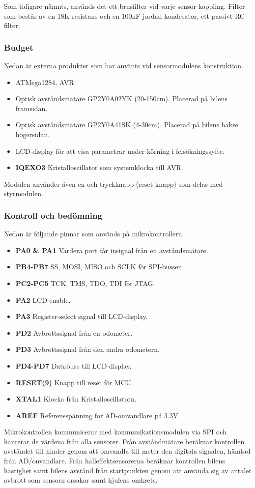 \documentclass[tekniskrapport/tech.tex]{subfiles}
\begin{document}
Som tidigare nämnts, används det ett brusfilter vid varje sensor koppling. Filter som består av en 18K resistans och en 100nF jordad kondesator, ett passivt RC-filter.

\subsubsection{Budget}
Nedan är externa produkter som har använts vid sensormodulens konstruktion.
\begin{itemize}
	\item \textbf{\modMicrocontroller} ATMega1284, AVR. 
    \item \textbf{\modDistf} Optisk avståndsmätare GP2Y0A02YK (20-150cm). Placerad på bilens framsidan.
    \item \textbf{\modDists} Optisk avståndsmätare GP2Y0A41SK (4-30cm). Placerad på bilens bakre högersidan.
    \item \textbf{\modLcd} LCD-display för att visa parametrar under körning
    i felsökningssyfte.
    \item \textbf{IQEXO3} Kristalloscillator som systemklocka till AVR.
\end{itemize}
Modulen använder även en {\modJtag} och tryckknapp (reset knapp) som delas med styrmodulen.

\subsubsection{Kontroll och bedömning}
Nedan är följande pinnar som används på mikrokontrollern.
\begin{itemize}
   \item \textbf{PA0 \& PA1} Vardera port får insignal från en avståndsmätare.
   \item \textbf{PB4-PB7} SS, MOSI, MISO och SCLK för SPI-bussen.
   \item \textbf{PC2-PC5} TCK, TMS, TDO, TDI för JTAG.
   \item \textbf{PA2} LCD-enable.
   \item \textbf{PA3} Register-select signal till LCD-display.
   \item \textbf{PD2} Avbrottssignal från en odometer.
   \item \textbf{PD3} Avbrottssignal från den andra odometern.
   \item \textbf{PD4-PD7} Databuss till LCD-display.
   \item \textbf{RESET(9)} Knapp till reset för MCU.
   \item \textbf{XTAL1} Klocka från Kristalloscillatorn. 
   \item \textbf{AREF} Referensspänning för AD-omvandlare på 3.3V.

\end{itemize}
Mikrokontrollen kommunicerar med kommunikationsmodulen via SPI och hanterar de värdena från alla sensorer. Från avståndmätare beräknar kontrollen avståndet till hinder genom att omvandla till meter den digitala signalen, hämtad från AD/onvandlare. Från halleffektsensorerna beräknar kontrollen bilens hastighet samt bilens avstånd från startpunkten genom att använda sig av antalet avbrott som sensorn orsakar samt hjulens omkrets. 
\end{document}

